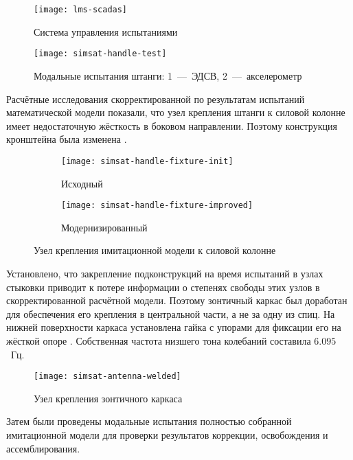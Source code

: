 \begin{figure}[!htb]
	\centerfloat
	\texttt{[image: lms-scadas]}
	\caption{Система управления испытаниями } \label{fig:lms-scadas}
\end{figure}

\begin{figure}[!htb]
	\centerfloat
	\texttt{[image: simsat-handle-test]}
	\caption{Модальные испытания штанги: 1~---~ЭДСВ, 2~---~акселерометр} \label{fig:simsat-handle-test}
\end{figure}

Расчётные исследования скорректированной по результатам испытаний математической модели показали, что узел крепления штанги к силовой колонне имеет недостаточную жёсткость в боковом направлении. Поэтому конструкция кронштейна была изменена . 

\begin{figure}[!htb]
	\centering
	\begin{subfigure}[t]{0.335\textwidth}
		\centering
		\texttt{[image: simsat-handle-fixture-init]}
		\caption{Исходный}
	\end{subfigure}
	\qquad
	\begin{subfigure}[t]{0.35\textwidth}
		\centering
		\texttt{[image: simsat-handle-fixture-improved]}
		\caption{Модернизированный}
	\end{subfigure}	
	\caption{Узел крепления имитационной модели к силовой колонне} \label{fig:simsat-handle-fixture}
\end{figure}

Установлено, что закрепление подконструкций на время испытаний в узлах стыковки приводит к потере информации о степенях свободы этих узлов в скорректированной расчётной модели. Поэтому зонтичный каркас был доработан для обеспечения его крепления в центральной части, а не за одну из спиц. На нижней поверхности каркаса установлена гайка с упорами для фиксации его на жёсткой опоре . Собственная частота низшего тона колебаний составила $ 6.095 $~Гц.

\begin{figure}[!htb]
	\centerfloat
	\texttt{[image: simsat-antenna-welded]}
	\caption{Узел крепления зонтичного каркаса} \label{fig:simsat-antenna-welded}
\end{figure}

Затем были проведены модальные испытания полностью собранной имитационной модели для проверки результатов коррекции, освобождения и ассемблирования. 

